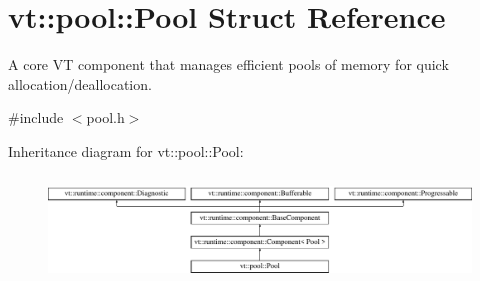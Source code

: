 \hypertarget{structvt_1_1pool_1_1_pool}{}\section{vt\+:\+:pool\+:\+:Pool Struct Reference}
\label{structvt_1_1pool_1_1_pool}


A core VT component that manages efficient pools of memory for quick allocation/deallocation.  




{\ttfamily \#include $<$pool.\+h$>$}

Inheritance diagram for vt\+:\+:pool\+:\+:Pool\+:\begin{figure}[H]
\begin{center}
\leavevmode
\includegraphics[height=2.849873cm]{structvt_1_1pool_1_1_pool}
\end{center}
\end{figure}

